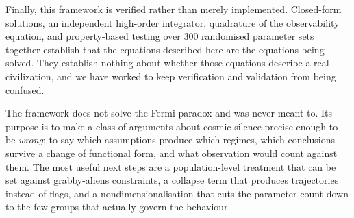 Finally, this framework is verified rather than merely implemented. Closed-form
solutions, an independent high-order integrator, quadrature of the observability
equation, and property-based testing over 300 randomised parameter sets together
establish that the equations described here are the equations being solved. They
establish nothing about whether those equations describe a real civilization,
and we have worked to keep verification and validation from being confused.

The framework does not solve the Fermi paradox and was never meant to. Its
purpose is to make a class of arguments about cosmic silence precise enough to
be \emph{wrong}: to say which assumptions produce which regimes, which
conclusions survive a change of functional form, and what observation would
count against them. The most useful next steps are a population-level treatment
that can be set against grabby-aliens constraints, a collapse term that produces
trajectories instead of flags, and a nondimensionalisation that cuts the
parameter count down to the few groups that actually govern the behaviour.
